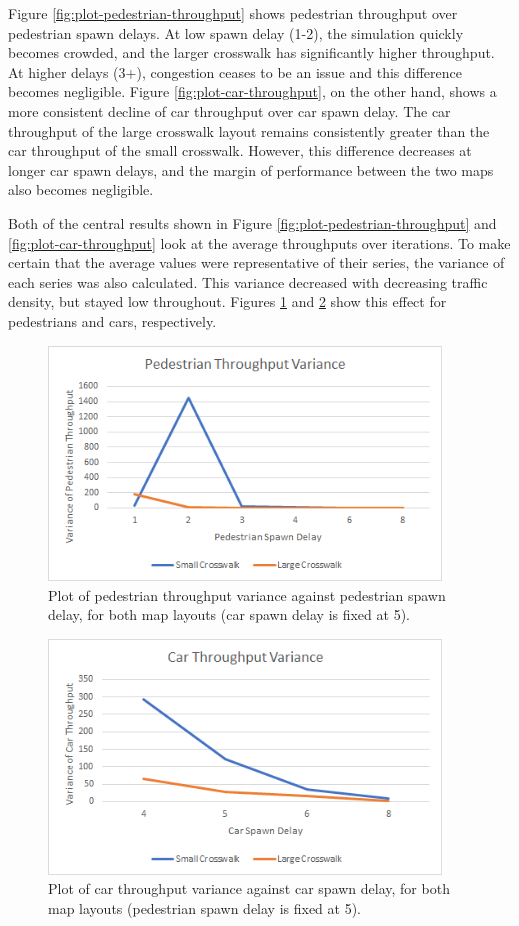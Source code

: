 Figure \ref{fig:plot-pedestrian-throughput} shows pedestrian throughput over pedestrian spawn delays. At low spawn delay (1-2), the simulation quickly becomes crowded, and the larger crosswalk has significantly higher throughput. At higher delays (3+), congestion ceases to be an issue and this difference becomes negligible. Figure \ref{fig:plot-car-throughput}, on the other hand, shows a more consistent decline of car throughput over car spawn delay. The car throughput of the large crosswalk layout remains consistently greater than the car throughput of the small crosswalk. However, this difference decreases at longer car spawn delays, and the margin of performance between the two maps also becomes negligible.

Both of the central results shown in Figure \ref{fig:plot-pedestrian-throughput} and \ref{fig:plot-car-throughput} look at the average throughputs over iterations. To make certain that the average values were representative of their series, the variance of each series was also calculated. This variance decreased with decreasing traffic density, but stayed low throughout. Figures \ref{fig:plot-pedestrian-variance} and \ref{fig:plot-car-variance} show this effect for pedestrians and cars, respectively.

\begin{figure}[h]
    \centering
    \includegraphics[width=4.1in]{images/plot-pedestrian-variance.png}
    \caption{Plot of pedestrian throughput variance against pedestrian spawn delay, for both map layouts (car spawn delay is fixed at 5).}
    \label{fig:plot-pedestrian-variance}
\end{figure}

\begin{figure}[h]
    \centering
    \includegraphics[width=4.1in]{images/plot-car-variance.png}
    \caption{Plot of car throughput variance against car spawn delay, for both map layouts (pedestrian spawn delay is fixed at 5).}
    \label{fig:plot-car-variance}
\end{figure}

